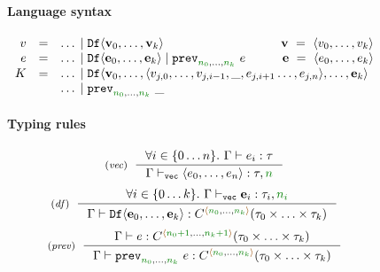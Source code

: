 
\begin{figure}[t]
\vspace{-0.5em}
\paragraph{Language syntax}
\begin{equation*}
\begin{array}{rcl}
v &=& \ldots \sep \ident{Df}\langle \textbf{v}_0, \ldots, \textbf{v}_k \rangle
    \hspace{9.5em} \textbf{v} ~=~ \langle v_0, \ldots, v_k \rangle \\
e &=& \ldots \sep \ident{Df}\langle \textbf{e}_0, \ldots, \textbf{e}_k \rangle \sep \ident{prev}_{\cclrd{n_0}, \ldots, \cclrd{n_k}}~e
    \quad\qquad \textbf{e} ~=~ \langle e_0, \ldots, e_k \rangle \\
K &=& \ldots \sep \ident{Df}\langle \textbf{v}_0, \ldots, \langle v_{j,0}, \ldots, v_{j, i-1}, \_, e_{j, i+1} \ldots, e_{j, n}\rangle, \ldots, \textbf{e}_k\rangle \\
   && \ldots \sep \ident{prev}_{\cclrd{n_0}, \ldots, \cclrd{n_k}}~\_
\end{array}
\end{equation*}

\vspace{0.75em}
\paragraph{Typing rules}

\begin{equation*}
\tyrule{vec}
  { \forall i\in\{0\ldots n\}. ~ \Gamma \vdash e_i : \tau}
  { \Gamma \vdash_{\ident{vec}} \langle e_0, \ldots, e_n \rangle : \tau, \cclrd{n} }
\end{equation*}
\begin{equation*}
\tyrule{df}
  { \forall i\in\{0\ldots k\}. ~ \Gamma \vdash_{\ident{vec}} \textbf{e}_i : \tau_i, \cclrd{n_i}}
  { \Gamma \vdash \ident{Df}\langle \textbf{e}_0, \ldots, \textbf{e}_k \rangle : \ctyp{\alift{\cclrd{n_0}, \ldots, \cclrd{n_k}}}{(\tau_0\times\ldots\times\tau_k)} }
\end{equation*}
\begin{equation*}
\tyrule{prev}
  { \Gamma \vdash e : \ctyp{\alift{\cclrd{n_0+1},\ldots,\cclrd{n_k+1}}}{(\tau_0\times\ldots\times\tau_k)} }
  { \Gamma \vdash \ident{prev}_{\cclrd{n_0},\ldots,\cclrd{n_k}}~e : \ctyp{\alift{\cclrd{n_0},\ldots,\cclrd{n_k}}}{(\tau_0\times\ldots\times\tau_k)} }
\end{equation*}


\end{figure}
